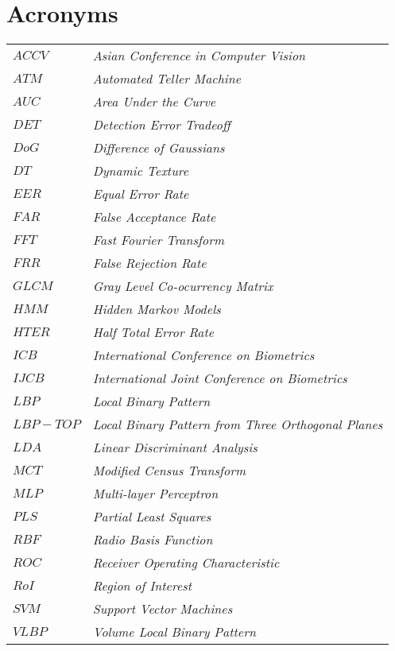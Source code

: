 
\chapter*{Acronyms}

\begin{tabular}{ll}
$ACCV$ & \textit{Asian Conference in Computer Vision} \\
$ATM$ & \textit{Automated Teller Machine} \\
$AUC$ & \textit{Area Under the Curve} \\

$DET$ & \textit{Detection Error Tradeoff} \\
$DoG$ & \textit{Difference of Gaussians} \\
$DT$ & \textit{Dynamic Texture} \\

$EER$ & \textit{Equal Error Rate} \\

$FAR$ & \textit{False Acceptance Rate} \\
$FFT$ & \textit{Fast Fourier Transform} \\
$FRR$ & \textit{False Rejection Rate} \\

$GLCM$ & \textit{Gray Level Co-ocurrency Matrix} \\

$HMM$ & \textit{Hidden Markov Models} \\
$HTER$ & \textit{Half Total Error Rate} \\

$ICB$ & \textit{International Conference on Biometrics} \\
$IJCB$ & \textit{International Joint Conference on Biometrics} \\

$LBP$ & \textit{Local Binary Pattern} \\
$LBP-TOP$ & \textit{Local Binary Pattern from Three Orthogonal Planes} \\
$LDA$ & \textit{Linear Discriminant Analysis} \\

$MCT$ & \textit{Modified Census Transform} \\
$MLP$ & \textit{Multi-layer Perceptron} \\

$PLS$ & \textit{Partial Least Squares} \\

$RBF$ & \textit{Radio Basis Function} \\
$ROC$ & \textit{Receiver Operating Characteristic} \\
$RoI$ & \textit{Region of Interest} \\

$SVM$ & \textit{Support Vector Machines} \\

$VLBP$ & \textit{Volume Local Binary Pattern} \\

\end{tabular}


